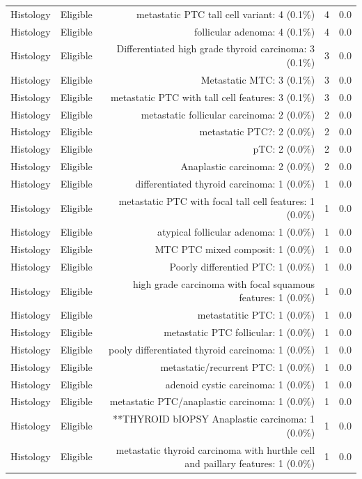 \begin{table}[htbp]
\begin{tabular}{lrrrr}
Histology & Eligible & metastatic PTC tall cell variant: 4 (0.1\%) & 4 & 0.0 \\
Histology & Eligible & follicular adenoma: 4 (0.1\%) & 4 & 0.0 \\
Histology & Eligible & Differentiated high grade thyroid carcinoma: 3 (0.1\%) & 3 & 0.0 \\
Histology & Eligible & Metastatic MTC: 3 (0.1\%) & 3 & 0.0 \\
Histology & Eligible & metastatic PTC with tall cell features: 3 (0.1\%) & 3 & 0.0 \\
Histology & Eligible & metastatic follicular carcinoma: 2 (0.0\%) & 2 & 0.0 \\
Histology & Eligible & metastatic PTC?: 2 (0.0\%) & 2 & 0.0 \\
Histology & Eligible & pTC: 2 (0.0\%) & 2 & 0.0 \\
Histology & Eligible & Anaplastic carcinoma: 2 (0.0\%) & 2 & 0.0 \\
Histology & Eligible & differentiated thyroid carcinoma: 1 (0.0\%) & 1 & 0.0 \\
Histology & Eligible & metastatic PTC with focal tall cell features: 1 (0.0\%) & 1 & 0.0 \\
Histology & Eligible & atypical follicular adenoma: 1 (0.0\%) & 1 & 0.0 \\
Histology & Eligible & MTC
PTC mixed composit: 1 (0.0\%) & 1 & 0.0 \\
Histology & Eligible & Poorly differentied PTC: 1 (0.0\%) & 1 & 0.0 \\
Histology & Eligible & high grade carcinoma with focal squamous features: 1 (0.0\%) & 1 & 0.0 \\
Histology & Eligible & metastatitic PTC: 1 (0.0\%) & 1 & 0.0 \\
Histology & Eligible & metastatic PTC follicular: 1 (0.0\%) & 1 & 0.0 \\
Histology & Eligible & pooly differentiated thyroid carcinoma: 1 (0.0\%) & 1 & 0.0 \\
Histology & Eligible & metastatic/recurrent PTC: 1 (0.0\%) & 1 & 0.0 \\
Histology & Eligible & adenoid cystic carcinoma: 1 (0.0\%) & 1 & 0.0 \\
Histology & Eligible & metastatic PTC/anaplastic carcinoma: 1 (0.0\%) & 1 & 0.0 \\
Histology & Eligible & **THYROID bIOPSY
Anaplastic carcinoma: 1 (0.0\%) & 1 & 0.0 \\
Histology & Eligible & metastatic thyroid carcinoma with hurthle cell and paillary features: 1 (0.0\%) & 1 & 0.0 \\

\end{tabular}
\end{table}
